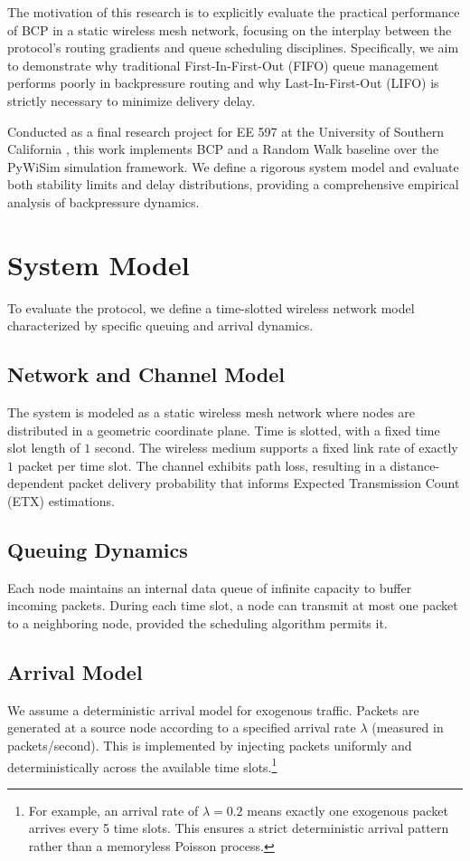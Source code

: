 \documentclass[10pt, twocolumn, letterpaper]{article}
\begin{document}
The motivation of this research is to explicitly evaluate the practical performance of BCP in a static wireless mesh network, focusing on the interplay between the protocol's routing gradients and queue scheduling disciplines. Specifically, we aim to demonstrate why traditional First-In-First-Out (FIFO) queue management performs poorly in backpressure routing and why Last-In-First-Out (LIFO) is strictly necessary to minimize delivery delay. 

Conducted as a final research project for EE 597 at the University of Southern California \cite{b2}, this work implements BCP and a Random Walk baseline over the PyWiSim simulation framework. We define a rigorous system model and evaluate both stability limits and delay distributions, providing a comprehensive empirical analysis of backpressure dynamics.

\section{System Model}
To evaluate the protocol, we define a time-slotted wireless network model characterized by specific queuing and arrival dynamics.

\subsection{Network and Channel Model}
The system is modeled as a static wireless mesh network where nodes are distributed in a geometric coordinate plane. Time is slotted, with a fixed time slot length of $1$ second. The wireless medium supports a fixed link rate of exactly $1$ packet per time slot. The channel exhibits path loss, resulting in a distance-dependent packet delivery probability that informs Expected Transmission Count (ETX) estimations.

\subsection{Queuing Dynamics}
Each node maintains an internal data queue of infinite capacity to buffer incoming packets. During each time slot, a node can transmit at most one packet to a neighboring node, provided the scheduling algorithm permits it. 

\subsection{Arrival Model}
We assume a deterministic arrival model for exogenous traffic. Packets are generated at a source node according to a specified arrival rate $\lambda$ (measured in packets/second). This is implemented by injecting packets uniformly and deterministically across the available time slots.\footnote{For example, an arrival rate of $\lambda = 0.2$ means exactly one exogenous packet arrives every 5 time slots. This ensures a strict deterministic arrival pattern rather than a memoryless Poisson process.}
\end{document}
